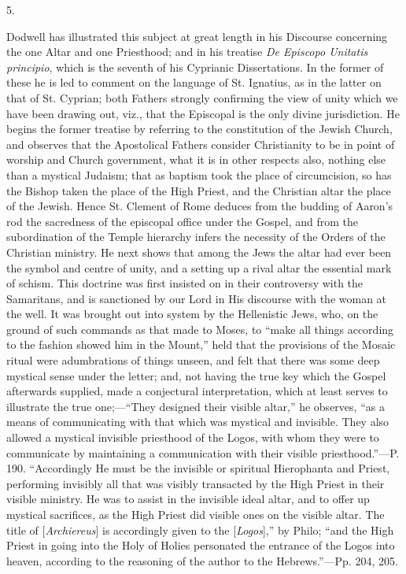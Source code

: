 5.

Dodwell has illustrated this subject at great
length in his Discourse concerning the one Altar and one Priesthood;
and in his treatise \emph{De Episcopo Unitatis principio}, which is
the seventh of his Cyprianic Dissertations. In the former of these he
is led to comment on the language of St. Ignatius, as in the latter on
that of St. Cyprian; both Fathers strongly confirming the view of
unity which we have been drawing out, viz., that the Episcopal is the
only divine jurisdiction. He begins the former treatise by referring
to the constitution of the Jewish Church, and observes that the
Apostolical Fathers consider Christianity to be in point of worship
and Church government, what it is in other respects also, nothing else
than a mystical Judaism; that as baptism took the place of
circumcision, so has the Bishop taken the place of the High Priest,
and the Christian altar the place of the Jewish. Hence St. Clement of
Rome deduces from the budding of Aaron's rod the sacredness of
the episcopal office under the Gospel, and from the subordination of
the Temple hierarchy infers the necessity of the Orders of the
Christian ministry. He next shows that among the Jews the altar had
ever been the symbol and centre of unity, and a setting up a rival
altar the essential mark of schism. This doctrine was first insisted
on in their controversy with the Samaritans, and is sanctioned by our
Lord in His discourse with the woman at the well. It was brought out
into system by the Hellenistic Jews, who, on the ground of such
commands as that made to Moses, to ``make all things according to the
fashion showed him in the Mount,'' held that the provisions of the
Mosaic ritual were adumbrations of things unseen, and felt that there
was some deep mystical sense under the letter; and, not having the
true key which the Gospel afterwards supplied, made a conjectural
interpretation, which at least serves to illustrate the true one;—``They
designed their visible altar,'' he observes, ``as a means of
communicating with that which was mystical and invisible. They also
allowed a mystical invisible priesthood of the Logos, with whom they
were to communicate by maintaining a communication with their visible
priesthood.''—P. 190. ``Accordingly He must be the invisible or
spiritual Hierophanta and Priest, performing invisibly all that was
visibly transacted by the High Priest in their visible ministry. He
was to assist in the invisible ideal altar, and to offer up mystical
sacrifices, as the High Priest did visible ones on the visible altar.
The title of [\emph{Archiereus}] is accordingly given to the [\emph{Logos}],''
by Philo; ``and the High Priest in going into the Holy of Holies
personated the entrance of the Logos into heaven, according to the
reasoning of the author to the Hebrews.''—Pp. 204, 205.

